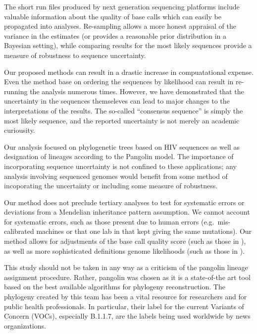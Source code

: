 \documentclass[
]{article}
\begin{document}
The short run files produced by next generation sequencing platforms
include valuable information about the quality of base calls which can
easily be propagated into analyses. Re-sampling allows a more honest
appraisal of the variance in the estimates (or provides a reasonable
prior distribution in a Bayesian setting), while comparing results for
the most likely sequences provide a measure of robustness to sequence
uncertainty.

Our proposed methods can result in a drastic increase in compuatational
expense. Even the method base on ordering the sequences by likelihood
can result in re-running the analysis numerous times. However, we have
demonstrated that the uncertainty in the sequences themseleves can lead
to major changes to the interpretations of the results. The so-called
``consensus sequence'' is simply the most likely sequence, and the
reported uncertainty is not merely an academic curiousity.

Our analysis focused on phylogenetic trees based on HIV sequences as
well as designation of lineages according to the Pangolin model. The
importance of incorporating sequence uncertainty is not confined to
these applications; any analysis involving sequenced genomes would
benefit from some method of incoporating the uncertainty or including
some measure of robustness.

Our method does not preclude tertiary analyses to test for systematic
errors or deviations from a Mendelian inheritance pattern assumption. We
cannot account for systematic errors, such as those present due to human
errors (e.g.~mis-calibrated machines or that one lab in \citet{blank}
that kept giving the same mutations). Our method allows for adjustments
of the base call quality score (such as those in \citet{blank}), as well
as more sophisticated definitions genome likelihoods (such as those in
\citet{blank2}).

This study should not be taken in any way as a criticism of the pangolin
lineage assignment procedure. Rather, pangolin was chosen as it is a
state-of-the art tool based on the best available algorithms for
phylogeny reconstruction. The phylogeny created by this team has been a
vital resource for researchers and for public health professionals. In
particular, their label for the current Variants of Concern (VOCs),
especially B.1.1.7, are the labels being used worldwide by news
organizations.
\end{document}
